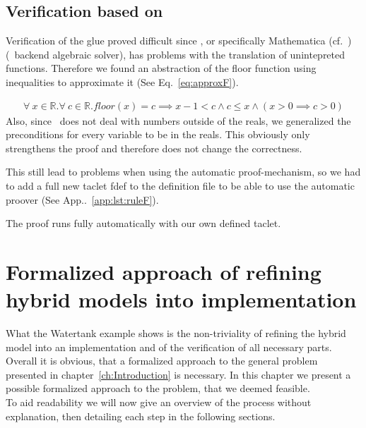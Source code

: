\section{Verification based on \keym}
\label{sec:Watertank:Verification}

Verification of the glue proved difficult since \keym, or specifically Mathematica (cf.~\cite{mathematica}) (\keym~backend algebraic solver), has problems with the translation of unintepreted functions. Therefore we found an abstraction of the floor function using inequalities to approximate it (See Eq.~\ref{eq:approxF}). 

\begin{align*}
		\forall~x \in \mathbb{R}. \forall~c \in \mathbb{R}. floor(x) = c \implies x-1 < c \wedge c \leq x \wedge( x>0\implies c>0)
	\label{eq:approxF}
\end{align*}
Also, since \keym~does not deal with numbers outside of the reals, we generalized the preconditions for every variable to be in the reals. This obviously only strengthens the proof and therefore does not change the correctness.

This still lead to problems when using the automatic proof-mechanism, so we had to add a full new taclet fdef to the definition file to be able to use the automatic proover (See App..~\ref{app:lst:ruleF}).

The proof runs fully automatically with our own defined taclet.

\chapter{Formalized approach of refining hybrid models into implementation}
\label{ch:Process}

What the Watertank example shows is the non-triviality of refining the hybrid model into an implementation and of the verification of all necessary parts. Overall it is obvious, that a formalized approach to the general problem presented in chapter~\ref{ch:Introduction} is necessary. In this chapter we present a possible formalized approach to the problem, that we deemed feasible.
\\


To aid readability we will now give an overview of the process without explanation, then detailing each step in the following sections. 

